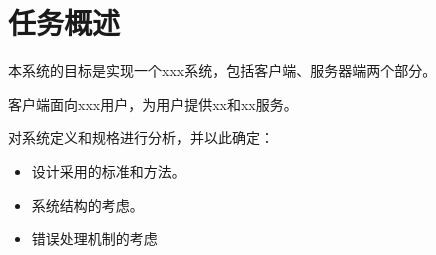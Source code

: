 \chapter{任务概述}
本系统的目标是实现一个xxx系统，包括客户端、服务器端两个部分。

客户端面向xxx用户，为用户提供xx和xx服务。

对系统定义和规格进行分析，并以此确定：
\begin{itemize}
    \item 设计采用的标准和方法。
    \item 系统结构的考虑。
    \item 错误处理机制的考虑
\end{itemize}
